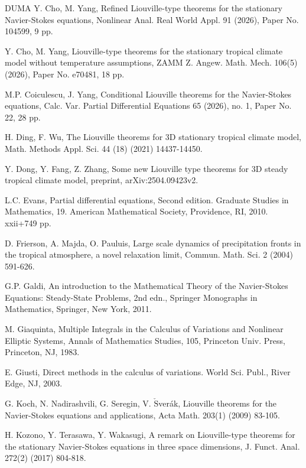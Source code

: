 \documentclass[11pt,reqno]{amsart}
\numberwithin{Thm}{section}
\begin{document}
\begin {thebibliography}{DUMA}
 Y. Cho, M. Yang, Refined Liouville-type theorems for the stationary Navier-Stokes equations, Nonlinear Anal. Real World Appl. 91 (2026), Paper No. 104599, 9 pp.

 Y. Cho, M. Yang, Liouville-type theorems for the stationary tropical climate model without temperature assumptions, ZAMM Z. Angew. Math. Mech. 106(5) (2026), Paper No. e70481, 18 pp.

 M.P. Coiculescu, J. Yang, Conditional Liouville theorems for the Navier-Stokes equations, Calc. Var. Partial Differential Equations 65 (2026), no. 1, Paper No. 22, 28 pp.

 H. Ding, F. Wu, The Liouville theorems for 3D stationary tropical climate model, Math. Methods Appl. Sci. 44 (18) (2021) 14437-14450.

 Y. Dong, Y. Fang, Z. Zhang, Some new Liouville type theorems for 3D steady tropical climate model, preprint, arXiv:2504.09423v2.

 L.C. Evans, Partial differential equations, Second edition. Graduate Studies in Mathematics, 19. American Mathematical Society, Providence, RI, 2010. xxii+749 pp.

 D. Frierson, A. Majda, O. Pauluis, Large scale dynamics of precipitation fronts in the tropical atmosphere, a novel relaxation limit, Commun. Math. Sci. 2 (2004) 591-626.

 G.P. Galdi, An introduction to the Mathematical Theory of the Navier-Stokes Equations: Steady-State Problems, 2nd edn., Springer Monographs in Mathematics, Springer, New York, 2011.

 M. Giaquinta, Multiple Integrals in the Calculus of Variations and Nonlinear Elliptic Systems, Annals of Mathematics Studies, 105, Princeton Univ. Press, Princeton, NJ, 1983.

 E. Giusti, Direct methods in the calculus of variations. World Sci. Publ., River Edge, NJ, 2003.

 G. Koch, N. Nadirashvili,  G. Seregin, V. $\mathrm{\check{S}}$ver\'{a}k, Liouville theorems for the Navier-Stokes equations and applications, Acta Math. 203(1) (2009) 83-105.

 H. Kozono, Y. Terasawa, Y. Wakasugi,  A remark on Liouville-type theorems for the stationary Navier-Stokes equations in three space dimensions, J. Funct. Anal. 272(2) (2017) 804-818.


\end{thebibliography}
\end{document}

